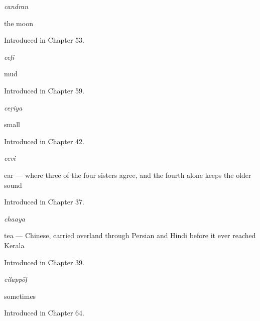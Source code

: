 \noindent\begin{minipage}[t]{\linewidth}
\raggedright
\textbf{}\enspace\emph{candran}\par
\small the moon\par
\footnotesize Introduced in Chapter 53.
\end{minipage}\par\medskip

\noindent\begin{minipage}[t]{\linewidth}
\raggedright
\textbf{}\enspace\emph{ceḷi}\par
\small mud\par
\footnotesize Introduced in Chapter 59.
\end{minipage}\par\medskip

\noindent\begin{minipage}[t]{\linewidth}
\raggedright
\textbf{}\enspace\emph{ceṟiya}\par
\small small\par
\footnotesize Introduced in Chapter 42.
\end{minipage}\par\medskip

\noindent\begin{minipage}[t]{\linewidth}
\raggedright
\textbf{}\enspace\emph{cevi}\par
\small ear — where three of the four sisters agree, and the fourth alone keeps the older sound\par
\footnotesize Introduced in Chapter 37.
\end{minipage}\par\medskip

\noindent\begin{minipage}[t]{\linewidth}
\raggedright
\textbf{}\enspace\emph{chaaya}\par
\small tea — Chinese, carried overland through Persian and Hindi before it ever reached Kerala\par
\footnotesize Introduced in Chapter 39.
\end{minipage}\par\medskip

\noindent\begin{minipage}[t]{\linewidth}
\raggedright
\textbf{}\enspace\emph{cilappōḷ}\par
\small sometimes\par
\footnotesize Introduced in Chapter 64.
\end{minipage}\par\medskip

